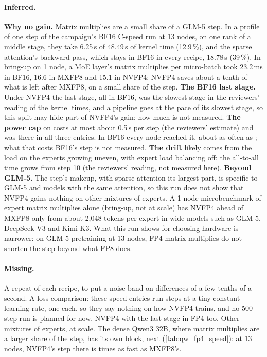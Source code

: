 \paragraph{Inferred.} \textbf{Why no gain.} Matrix multiplies are a small share of a GLM-5 step. In a profile of one step of the campaign's BF16 C-speed run at 13 nodes, on one rank of a middle stage, they take 6.25\,s of 48.49\,s of kernel time (12.9\,\%), and the sparse attention's backward pass, which stays in BF16 in every recipe, 18.78\,s (39\,\%). In bring-up on 1 node, a MoE layer's matrix multiplies per micro-batch took 23.2\,ms in BF16, 16.6 in MXFP8 and 15.1 in NVFP4: NVFP4 saves about a tenth of what is left after MXFP8, on a small share of the step. \textbf{The BF16 last stage.} Under NVFP4 the last stage, all in BF16, was the slowest stage in the reviewers' reading of the kernel times, and a pipeline goes at the pace of its slowest stage, so this split may hide part of NVFP4's gain; how much is not measured. \textbf{The power cap} on \texttt{\TriFpFourLastHost} costs at most about 0.5\,s per step (the reviewers' estimate) and was there in all three entries. In BF16 every node reached it, about as often as \texttt{\TriFpFourLastHost}; what that costs BF16's step is not measured. \textbf{The drift} likely comes from the load on the experts growing uneven, with expert load balancing off: the all-to-all time grows from step 10 (the reviewers' reading, not measured here). \textbf{Beyond GLM-5.} The step's makeup, with sparse attention its largest part, is specific to GLM-5 and models with the same attention, so this run does not show that NVFP4 gains nothing on other mixtures of experts. A 1-node microbenchmark of expert matrix multiplies alone (bring-up, not at scale) has NVFP4 ahead of MXFP8 only from about 2,048 tokens per expert in wide models such as GLM-5, DeepSeek-V3 and Kimi K3. What this run shows for choosing hardware is narrower: on GLM-5 pretraining at 13 nodes, FP4 matrix multiplies do not shorten the step beyond what FP8 does.

\paragraph{Missing.} A repeat of each recipe, to put a noise band on differences of a few tenths of a second. A loss comparison: these speed entries run \TriFpFourSteps{} steps at a tiny constant learning rate, one each, so they say nothing on how NVFP4 trains, and no 500-step run is planned for now. NVFP4 with the last stage in FP4 too. Other mixtures of experts, at scale. The dense Qwen3 32B, where matrix multiplies are a larger share of the step, has its own block, next (\cref{tab:qw_fp4_speed}): at 13 nodes, NVFP4's step there is \TriQwFpFourSpNvMx{} times as fast as MXFP8's.

